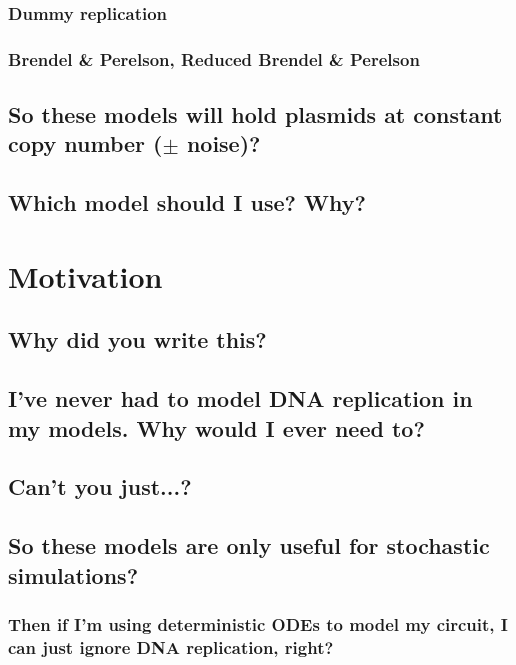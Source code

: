 \documentclass[preprint,12pt]{elsarticle}
\begin{document}
\subsubsection{Dummy replication}

\subsubsection{Brendel \& Perelson, Reduced Brendel \& Perelson}

\subsection{So these models will hold plasmids at constant copy number ($\pm$ noise)?}

\subsection{Which model should I use? Why?}

\section{Motivation}\label{S:motivation}

\subsection{Why did you write this?}

\subsection{I've never had to model DNA replication in my models. Why would I ever need to?}

\subsection{Can't you just...?}

\subsection{So these models are only useful for stochastic simulations?}

\subsubsection{Then if I'm using deterministic ODEs to model my circuit, I can just ignore DNA replication, right?}
\end{document}
